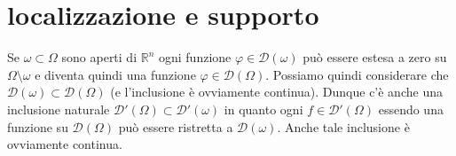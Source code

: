 \documentclass[italian,a4paper,oneside,headinclude]{scrbook}
\renewcommand{\phi}{\varphi}
\newcommand{\D}{\mathcal D}
\newcommand{\E}{\mathcal E}
\newcommand{\F}{\mathcal F}
\renewcommand{\L}{\mathcal L}
\newcommand{\NN}{\mathbb N}
\newcommand{\RR}{\mathbb R}
\newtheorem{theorem}{Teorema}
\begin{document}
\begin{comment}
Utilizzeremo il seguente risultato generale (conseguenza del teorema
di Banach-Steinhaus).
\begin{theorem}
  \cite[2.17]{Rudin}
  Sia $X$ uno spazio di Frechét, $Y,Z$ svt.
  Sia $B\colon X\times Y\to Z$ bilineare e
  separatamente continuo.
  Allora se $x_k\to x$ in $X$ e $y_k\to y$ in $Y$ si ha
  \[
  B(x_k, y_k) \to B(x,y)\qquad\text{in $Z$.}
  \]
\end{theorem}
%
\begin{proof}
  Siano $U$ e $W$ intorni di $0$ in $Z$ tali che
  $U+U\subset W$.
  Consideriamo la famiglia $\F\subset \L(X,Z)$
  \[
  \F = \{ x \mapsto B(x,y_k)\}_{k\in \NN}.
  \]
  Visto che $B(x,y_k)\to B(x,y)$ si ha che $\F(x)$ è limitato in $Z$ e
  dunque si può applicare il Teorema di Banach-Steinhaus
  (Teorema~\ref{th:BanachSteinhaus}). Dunque la famiglia $\F$ risulta
  equicontinua ovvero esiste un intorno $V$ di $0$ in $X$ tale che
  \[
  B(V,y_k) \subset U\qquad \forall k\in\NN.
  \]
  Visto che $x_k- x \to 0$ e $B(x,y_k-y) \to 0$
  per $k$ sufficientemente grande si avrà $x_k-x\in V$ e
  contemporaneamente $B(x,y_k-y)\in U$,
  dunque
  \begin{align*}
  B(x_k, y_k) - B(x,y) &= B(x_k-x,y_k) + B(x,y_k-y)\\
  &\in B(V,y_k)  + U \subset U + U \subset W.
  \end{align*}

\end{proof}


\begin{proof}[Dimostrazione Teorema~\ref{th:distr_prod_conv}]
  Fissato $\phi\in\D(\Omega)$ consideriamo la forma bilineare
  \[
  B(g, f) = (gf)[\phi] = f[g\phi].
  \]<
  Chiaramente $B$ è separatamente continuo su
  $\E(\Omega)\times \D'(\Omega)$ e applicando il teorema
  precedente
  si ottiene che se $g_k\to g$ e $f_k\to f$ allora
  \[
    (g_k f_k)[\phi] \to (gf)[\phi]
  \]
  da cui, per l'arbitrarietà di $\phi$: $g_kf_k \to fg$.
\end{proof}
\end{comment}

\section{localizzazione e supporto}

Se $\omega \subset \Omega$ sono aperti di $\RR^n$ ogni funzione $\phi
\in \D(\omega)$ può essere estesa a zero su $\Omega\setminus \omega$ e
diventa quindi una funzione $\phi \in \D(\Omega)$. Possiamo quindi
considerare che $\D(\omega)\subset \D(\Omega)$ (e l'inclusione è
ovviamente continua).
Dunque c'è anche una inclusione naturale $\D'(\Omega)\subset
\D'(\omega)$
in quanto ogni $f\in\D'(\Omega)$ essendo una funzione su $\D(\Omega)$ può essere
ristretta a $\D(\omega)$. Anche tale inclusione è ovviamente
continua.
\end{document}

